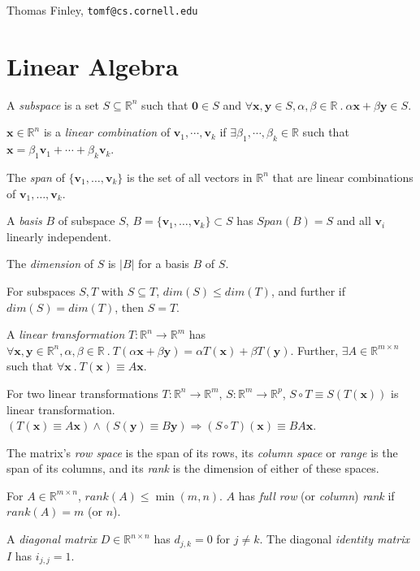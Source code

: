 \documentclass[landscape,10pt,letterpaper]{article}
\newcommand{\heading}[1]{\vspace{-1.5em} \section*{#1} \vspace{-1.0em}}
\begin{document}
\begin{multicols}{4}

Thomas Finley, \texttt{tomf@cs.cornell.edu}

\heading{Linear Algebra}

A \emph{subspace} is a set $S \subseteq \mathbb{R}^n$ such that $\mathbf{0} \in S$ and $\forall \mathbf{x}, \mathbf{y} \in S, \alpha, \beta \in \mathbb{R}\ .\ \alpha \mathbf{x} + \beta \mathbf{y} \in S$.

$\mathbf{x} \in \mathbb{R}^n$ is a \emph{linear combination} of $\mathbf{v}_1, \cdots, \mathbf{v}_k$ if $\exists \beta_1, \cdots, \beta_k \in \mathbb{R}$ such that $\mathbf{x} = \beta_1 \mathbf{v}_1 + \cdots + \beta_k \mathbf{v}_k$.

The \emph{span} of $\{ \mathbf{v}_1, \ldots, \mathbf{v}_k \}$ is the set of all vectors in $\mathbb{R}^n$ that are linear combinations of $\mathbf{v}_1, \ldots, \mathbf{v}_k$.

A \emph{basis} $B$ of subspace $S$, $B=\{ \mathbf{v}_1, \ldots, \mathbf{v}_k \} \subset S$ has $Span(B)=S$ and all $\mathbf{v}_i$ linearly independent.

The \emph{dimension} of $S$ is $|B|$ for a basis $B$ of $S$.

For subspaces $S, T$ with $S \subseteq T$, $dim(S) \leq dim(T)$, and further if $dim(S)=dim(T)$, then $S = T$.

A \emph{linear transformation} $T : \mathbb{R}^n \to \mathbb{R}^m$ has $\forall \mathbf{x}, \mathbf{y} \in \mathbb{R}^n, \alpha, \beta \in \mathbb{R} \ .\ T(\alpha \mathbf{x} + \beta \mathbf{y}) = \alpha T(\mathbf{x}) + \beta T(\mathbf{y})$.  Further, $\exists A \in \mathbb{R}^{m \times n}$ such that $\forall \mathbf{x} \ .\ T(\mathbf{x}) \equiv A \mathbf{x}$.

For two linear transformations $T : \mathbb{R}^n \to \mathbb{R}^m$, $S : \mathbb{R}^m \to \mathbb{R}^p$, $S \circ T \equiv S(T(\mathbf{x}))$ is linear transformation.  $(T(\mathbf{x}) \equiv A\mathbf{x}) \wedge (S(\mathbf{y}) \equiv B\mathbf{y}) \Rightarrow (S \circ T)(\mathbf{x}) \equiv BA\mathbf{x}$.

The matrix's \emph{row space} is the span of its rows, its \emph{column space} or \emph{range} is the span of its columns, and its \emph{rank} is the dimension of either of these spaces.

For $A \in \mathbb{R}^{m \times n}$, $rank(A) \leq \min(m,n)$.  $A$ has \emph{full row} (or \emph{column}) \emph{rank} if $rank(A)=m$ (or $n$).

A \emph{diagonal matrix} $D \in \mathbb{R}^{n \times n}$ has $d_{j,k}=0$ for $j \neq k$.  The diagonal \emph{identity matrix} $I$ has $i_{j,j}=1$.


\end{multicols}
\end{document}
